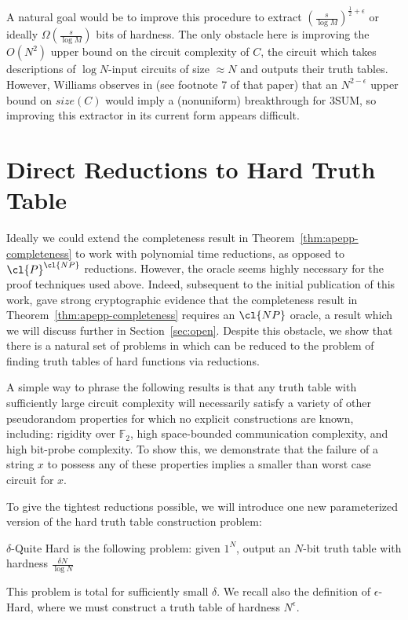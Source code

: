 A natural goal would be to improve this procedure to extract $(\frac{s}{\log M})^{\frac{1}{2} + \epsilon}$ or ideally $\Omega(\frac{s}{\log M})$ bits of hardness. The only obstacle here is improving the $O(N^2)$ upper bound on the circuit complexity of $C$, the circuit which takes descriptions of $\log N$-input circuits of size $\approx N$ and outputs their truth tables. However, Williams observes in \cite{sat-lb} (see footnote 7 of that paper) that an $N^{2 - \epsilon}$ upper bound on $size(C)$ would imply a (nonuniform) breakthrough for {\sc 3SUM}, so improving this extractor in its current form appears difficult.

\section{Direct  Reductions to {\sc Hard Truth Table}}\label{sec:direct-reductions}
Ideally we could extend the completeness result in Theorem~\ref{thm:apepp-completeness} to work with polynomial time reductions, as opposed to $\cl{P}^\cl{NP}$ reductions. However, the  oracle seems highly necessary for the proof techniques used above. Indeed, subsequent to the initial publication of this work, \cite{ILW} gave strong cryptographic evidence that the completeness result in Theorem~\ref{thm:apepp-completeness} requires an $\cl{NP}$ oracle, a result which we will discuss further in Section~\ref{sec:open}. Despite this obstacle, we show that there is a natural set of problems in  which can be reduced to the problem of finding truth tables of hard functions via  reductions.

A simple way to phrase the following results is that any truth table with sufficiently large circuit complexity will necessarily satisfy a variety of other pseudorandom properties for which no explicit constructions are known, including: rigidity over $\mathbb{F}_2$, high space-bounded communication complexity, and high bit-probe complexity. To show this, we demonstrate that the failure of a string $x$ to possess any of these properties implies a smaller than worst case circuit for $x$.

To give the tightest reductions possible, we will introduce one new parameterized version of the hard truth table construction problem:

\begin{definition}
{\sc $\delta$-Quite Hard} is the following problem: given $1^N$, output an $N$-bit truth table with hardness $\frac{\delta N}{\log N}$
\end{definition}
This problem is total for sufficiently small $\delta$. We recall also the definition of {\sc $\epsilon$-Hard}, where we must construct a truth table of hardness $N^{\epsilon}$.


